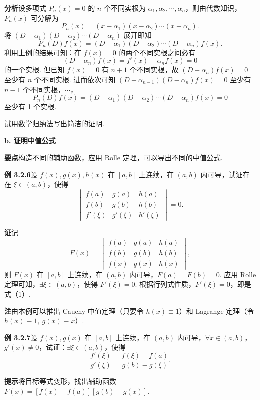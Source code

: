 \documentclass[UTF8,12pt,a4paper,fontset=fandol]{ctexart}
\begin{document}
\noindent\textbf{分析}\quad 设多项式 $P_n(x)=0$ 的 $n$ 个不同实根为 $\alpha_1,\alpha_2,\cdots,\alpha_n$，则由代数知识，$P_n(x)$ 可分解为
\[
  P_n(x)=(x-\alpha_1)(x-\alpha_2)\cdots(x-\alpha_n).
\]
将 $(D-\alpha_1)(D-\alpha_2)\cdots(D-\alpha_n)$ 展开即知
\[
  P_n(D)f(x)=(D-\alpha_1)(D-\alpha_2)\cdots(D-\alpha_n)f(x).
\]
利用上例的结果可知：在 $f(x)=0$ 的两个不同实根之间必有
\[
  (D-\alpha_n)f(x)=f'(x)-\alpha_nf(x)=0
\]
的一个实根. 但已知 $f(x)=0$ 有 $n+1$ 个不同实根，故 $(D-\alpha_n)f(x)=0$ 至少有 $n$ 个不同实根. 进而依次可知 $(D-\alpha_{n-1})(D-\alpha_n)f(x)=0$ 至少有 $n-1$ 个不同实根，$\cdots$，
\[
  P_n(D)f(x)=(D-\alpha_1)(D-\alpha_2)\cdots(D-\alpha_n)f(x)=0
\]
至少有 1 个实根.

试用数学归纳法写出简洁的证明.

\noindent\textbf{b. 证明中值公式}

\noindent\textbf{要点}\quad 构造不同的辅助函数，应用 Rolle 定理，可以导出不同的中值公式.

\noindent\textbf{例 3.2.6}\quad 设 $f(x),g(x),h(x)$ 在 $[a,b]$ 上连续，在 $(a,b)$ 内可导，试证存在 $\xi\in(a,b)$，使得
\begin{equation}
  \begin{vmatrix}
  f(a)&g(a)&h(a)\\
  f(b)&g(b)&h(b)\\
  f'(\xi)&g'(\xi)&h'(\xi)
  \end{vmatrix}=0.
\tag{1}
\end{equation}

\noindent\textbf{证}\quad 记
\[
  F(x)=
  \begin{vmatrix}
  f(a)&g(a)&h(a)\\
  f(b)&g(b)&h(b)\\
  f(x)&g(x)&h(x)
  \end{vmatrix},
\]
则 $F(x)$ 在 $[a,b]$ 上连续，在 $(a,b)$ 内可导，$F(a)=F(b)=0$. 应用 Rolle 定理可知，$\exists\xi\in(a,b)$，使得 $F'(\xi)=0$. 根据行列式性质，$F'(\xi)=0$，即是式（1）.

\noindent\textbf{注}\quad 由本例可以推出 Cauchy 中值定理（只要令 $h(x)\equiv1$）和 Lagrange 定理（令 $h(x)\equiv1,\ g(x)\equiv x$）.

\noindent\textbf{例 3.2.7}\quad 设 $f(x),g(x)$ 在 $[a,b]$ 上连续，在 $(a,b)$ 内可导，$\forall x\in(a,b)$，$g'(x)\ne0$，试证：$\exists\xi\in(a,b)$，使得
\[
  \frac{f'(\xi)}{g'(\xi)}=\frac{f(\xi)-f(a)}{g(b)-g(\xi)}.
\]

\noindent\textbf{提示}\quad 将目标等式变形，找出辅助函数 $F(x)=[f(x)-f(a)][g(b)-g(x)]$.
\end{document}
